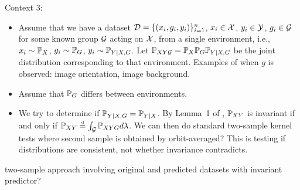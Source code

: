 \documentclass[10pt]{article}
\begin{document}
Context 3:

\begin{itemize}

\item
Assume that we have a dataset $\mathcal{D}=\{(x_i,g_i,y_i)\}_{i=1}^n$, $x_i\in\mathcal{X}$, $y_i\in\mathcal{Y}$, $g_i\in\mathcal{G}$ for some known group $\mathcal{G}$ acting on $\mathcal{X}$, from a single environment, i.e., $x_i\sim\mathbb{P}_X$, $g_i\sim\mathbb{P}_G$, $y_i\sim\mathbb{P}_{Y|X,G}$. Let $\mathbb{P}_{XY\mathcal{G}}=\mathbb{P}_X\mathbb{P}_G\mathbb{P}_{Y|X,G}$ be the joint distribution corresponding to that environment. Examples of when $g$ is observed: image orientation, image background.

\item
Assume that $\mathbb{P}_G$ differs between environments.

\item
We try to determine if $\mathbb{P}_{Y|X,G}=\mathbb{P}_{Y|X}$. \todo By Lemma~1 of \parencite{Elesedy:2021}, $\mathbb{P}_{XY}$ is invariant if and only if $\mathbb{P}_{XY}\stackrel{\text{\rm\tiny d}}{=}\int_{\mathcal{G}} \mathbb{P}_{XYG}d\lambda$. We can then do standard two-sample kernel tests where second sample is obtained by orbit-averaged? \todo This is testing if distributions are consistent, not whether invariance contradicts.

\end{itemize}

\todo two-sample approach involving original and predicted datasets with invariant predictor?
\end{document}
